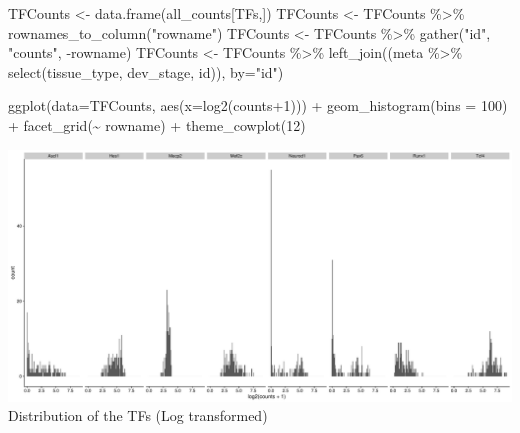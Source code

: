 \documentclass[
]{article}
\newenvironment{Shaded}{\begin{snugshade}}{\end{snugshade}}
\newcommand{\AttributeTok}[1]{\textcolor[rgb]{0.77,0.63,0.00}{#1}}
\newcommand{\DecValTok}[1]{\textcolor[rgb]{0.00,0.00,0.81}{#1}}
\newcommand{\FunctionTok}[1]{\textcolor[rgb]{0.00,0.00,0.00}{#1}}
\newcommand{\NormalTok}[1]{#1}
\newcommand{\OtherTok}[1]{\textcolor[rgb]{0.56,0.35,0.01}{#1}}
\newcommand{\SpecialCharTok}[1]{\textcolor[rgb]{0.00,0.00,0.00}{#1}}
\newcommand{\StringTok}[1]{\textcolor[rgb]{0.31,0.60,0.02}{#1}}
\begin{document}
\begin{Shaded}
\begin{Highlighting}[]
\NormalTok{TFCounts }\OtherTok{\textless{}{-}} \FunctionTok{data.frame}\NormalTok{(all\_counts[TFs,])}
\NormalTok{TFCounts }\OtherTok{\textless{}{-}}\NormalTok{ TFCounts }\SpecialCharTok{\%\textgreater{}\%} \FunctionTok{rownames\_to\_column}\NormalTok{(}\StringTok{"rowname"}\NormalTok{)}
\NormalTok{TFCounts }\OtherTok{\textless{}{-}}\NormalTok{ TFCounts }\SpecialCharTok{\%\textgreater{}\%} \FunctionTok{gather}\NormalTok{(}\StringTok{"id"}\NormalTok{, }\StringTok{"counts"}\NormalTok{, }\SpecialCharTok{{-}}\NormalTok{rowname)}
\NormalTok{TFCounts }\OtherTok{\textless{}{-}}\NormalTok{ TFCounts }\SpecialCharTok{\%\textgreater{}\%} \FunctionTok{left\_join}\NormalTok{((meta }\SpecialCharTok{\%\textgreater{}\%} \FunctionTok{select}\NormalTok{(tissue\_type, dev\_stage, id)), }\AttributeTok{by=}\StringTok{"id"}\NormalTok{)}

\FunctionTok{ggplot}\NormalTok{(}\AttributeTok{data=}\NormalTok{TFCounts, }\FunctionTok{aes}\NormalTok{(}\AttributeTok{x=}\FunctionTok{log2}\NormalTok{(counts}\SpecialCharTok{+}\DecValTok{1}\NormalTok{))) }\SpecialCharTok{+} \FunctionTok{geom\_histogram}\NormalTok{(}\AttributeTok{bins =} \DecValTok{100}\NormalTok{) }\SpecialCharTok{+} \FunctionTok{facet\_grid}\NormalTok{(}\SpecialCharTok{\textasciitilde{}}\NormalTok{  rowname) }\SpecialCharTok{+} \FunctionTok{theme\_cowplot}\NormalTok{(}\DecValTok{12}\NormalTok{)}
\end{Highlighting}
\end{Shaded}

\includegraphics{Exploration_files/figure-latex/unnamed-chunk-20-1.pdf}
Distribution of the TFs (Log transformed)
\end{document}
